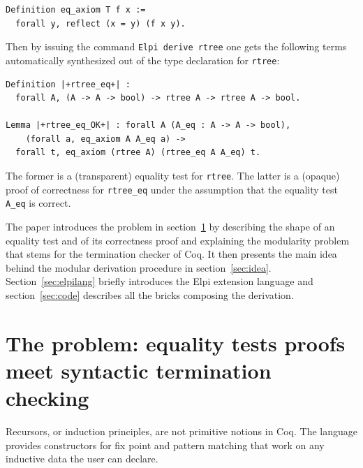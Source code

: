 \documentclass[sigplan,10pt,review]{acmart}\settopmatter{printfolios=true,printccs=false,printacmref=false}
\begin{document}
\begin{minipage}{\textwidth}\begin{lstlisting}
Definition eq_axiom T f x :=
  forall y, reflect (x = y) (f x y).
\end{lstlisting}\end{minipage}

\noindent
Then by issuing the command \lstinline+Elpi derive rtree+ one gets
the following terms automatically synthesized out of the type
declaration for \lstinline+rtree+:

\begin{minipage}{\textwidth}\begin{lstlisting}
Definition |+rtree_eq+| :
  forall A, (A -> A -> bool) -> rtree A -> rtree A -> bool.

Lemma |+rtree_eq_OK+| : forall A (A_eq : A -> A -> bool),
    (forall a, eq_axiom A A_eq a) ->
  forall t, eq_axiom (rtree A) (rtree_eq A A_eq) t.
\end{lstlisting}\end{minipage}

\noindent
The former is a (transparent) equality test for \lstinline+rtree+.
The latter is a (opaque) proof of correctness for \lstinline+rtree_eq+
under the assumption that the equality test \lstinline+A_eq+ is correct.

The paper introduces the problem in
section~\ref{sec:problem} by describing the shape of an equality test
and of its correctness proof and explaining the modularity problem
that stems for the termination checker of Coq. It then
presents the main idea behind the
modular derivation procedure in section~\ref{sec:idea}.
Section~\ref{sec:elpilang} briefly introduces the Elpi extension language
and section~\ref{sec:code} describes all the bricks composing the
derivation.


\section{The problem: equality tests proofs meet syntactic termination checking} %
\label{sec:problem}

Recursors, or induction principles, are not primitive notions in Coq.
The language provides constructors for fix point and pattern matching
that work on any inductive data the user can declare.
\end{document}
